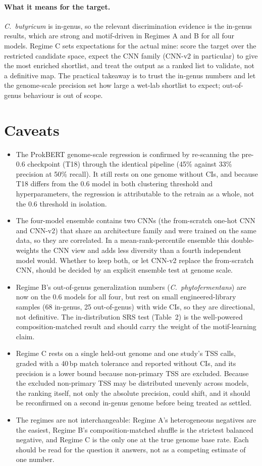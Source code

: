 \documentclass{article}
\begin{document}
\paragraph{What it means for the target.} \emph{C.\ butyricum} is in-genus, so the relevant discrimination evidence is the in-genus results, which are strong and motif-driven in Regimes A and B for all four models. Regime C sets expectations for the actual mine: score the target over the restricted candidate space, expect the CNN family (CNN-v2 in particular) to give the most enriched shortlist, and treat the output as a ranked list to validate, not a definitive map. The practical takeaway is to trust the in-genus numbers and let the genome-scale precision set how large a wet-lab shortlist to expect; out-of-genus behaviour is out of scope.

\section{Caveats}
\begin{itemize}
\item The ProkBERT genome-scale regression is confirmed by re-scanning the pre-0.6 checkpoint (T18) through the identical pipeline (45\% against 33\% precision at 50\% recall). It still rests on one genome without CIs, and because T18 differs from the 0.6 model in both clustering threshold and hyperparameters, the regression is attributable to the retrain as a whole, not the 0.6 threshold in isolation.
\item The four-model ensemble contains two CNNs (the from-scratch one-hot CNN and CNN-v2) that share an architecture family and were trained on the same data, so they are correlated. In a mean-rank-percentile ensemble this double-weights the CNN view and adds less diversity than a fourth independent model would. Whether to keep both, or let CNN-v2 replace the from-scratch CNN, should be decided by an explicit ensemble test at genome scale.
\item Regime B's out-of-genus generalization numbers (\emph{C.\ phytofermentans}) are now on the 0.6 models for all four, but rest on small engineered-library samples (68 in-genus, 25 out-of-genus) with wide CIs, so they are directional, not definitive. The in-distribution SRS test (Table~2) is the well-powered composition-matched result and should carry the weight of the motif-learning claim.
\item Regime C rests on a single held-out genome and one study's TSS calls, graded with a 40\,bp match tolerance and reported without CIs, and its precision is a lower bound because non-primary TSS are excluded. Because the excluded non-primary TSS may be distributed unevenly across models, the ranking itself, not only the absolute precision, could shift, and it should be reconfirmed on a second in-genus genome before being treated as settled.
\item The regimes are not interchangeable: Regime A's heterogeneous negatives are the easiest, Regime B's composition-matched shuffle is the strictest balanced negative, and Regime C is the only one at the true genome base rate. Each should be read for the question it answers, not as a competing estimate of one number.
\end{itemize}
\end{document}
